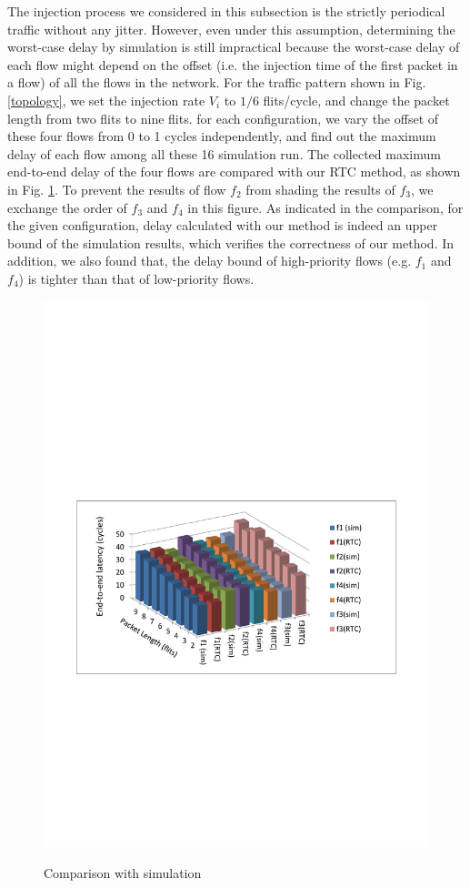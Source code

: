 \documentclass[preprint]{elsarticle}
\begin{document}
The injection process we considered in this subsection is the strictly periodical traffic without any jitter. However, even under this assumption, determining the worst-case delay by simulation is still impractical because the worst-case delay of each flow might depend on the offset (i.e. the injection time of the first packet in a flow) of all the flows in the network. For the traffic pattern shown in Fig. \ref{topology}, we set the injection rate $V_i$ to $1/6$ flits/cycle, and change the packet length from two flits to nine flits. for each configuration, we vary the offset of these four flows from 0 to 1 cycles independently, and find out the maximum delay of each flow among all these 16 simulation run. The collected maximum end-to-end delay of the four flows are compared with our RTC method, as shown in Fig. \ref{rtcvssim}. To prevent the results of flow $f_2$ from shading the results of $f_3$, we exchange the order of $f_3$ and $f_4$ in this figure. As indicated in the comparison, for the given configuration, delay calculated with our method is indeed an upper bound of the simulation results, which verifies the correctness of our method. In addition, we also found that, the delay bound of high-priority flows (e.g. $f_1$ and $f_4$) is tighter than that of low-priority flows.
\begin{figure}
  \centering
  \includegraphics[scale=0.8]{figures/rtcvssim.pdf}\\
  \caption{Comparison with simulation}\label{rtcvssim}
\end{figure}
\end{document}
